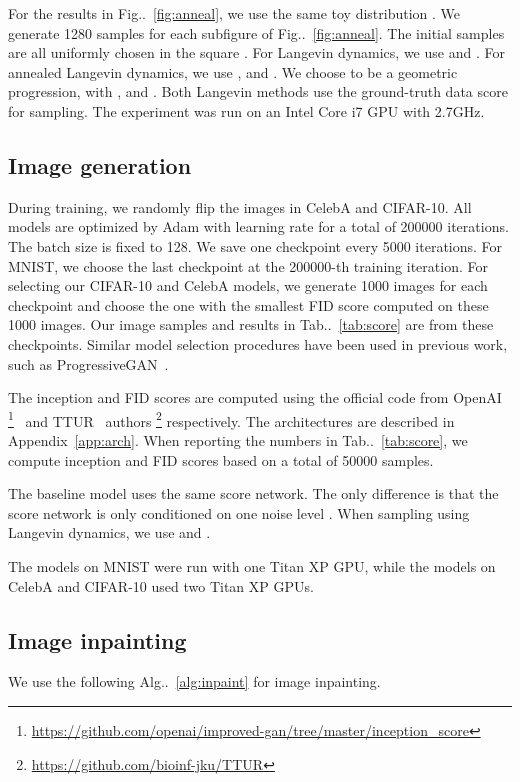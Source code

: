 \documentclass{article}
\makeatletter
\def\@onedot{\ifx\@let@token.\else.\null\fi\xspace}
\DeclareRobustCommand\onedot{\futurelet\@let@token\@onedot}
\newcommand{\figref}[1]{Fig\onedot~\ref{#1}}
\newcommand{\algoref}[1]{Alg\onedot~\ref{#1}}
\newcommand{\tabref}[1]{Tab\onedot~\ref{#1}}
\makeatother
\begin{document}
For the results in \figref{fig:anneal}, we use the same toy distribution . We generate 1280 samples for each subfigure of \figref{fig:anneal}. The initial samples are all uniformly chosen in the square . For Langevin dynamics, we use  and . For annealed Langevin dynamics, we use ,  and . We choose  to be a geometric progression, with ,  and . Both Langevin methods use the ground-truth data score for sampling. The experiment was run on an Intel Core i7 GPU with 2.7GHz.

\subsection{Image generation}
During training, we randomly flip the images in CelebA and CIFAR-10. All models are optimized by Adam with learning rate  for a total of 200000 iterations. The batch size is fixed to 128. We save one checkpoint every 5000 iterations. For MNIST, we choose the last checkpoint at the 200000-th training iteration. For selecting our CIFAR-10 and CelebA models, we generate 1000 images for each checkpoint and choose the one with the smallest FID score computed on these 1000 images. Our image samples and results in \tabref{tab:score} are from these checkpoints. Similar model selection procedures have been used in previous work, such as ProgressiveGAN~\cite{karras2018progressive}.

The inception and FID scores are computed using the official code from OpenAI \footnote{\href{https://github.com/openai/improved-gan/tree/master/inception_score}{\color{cyan}https://github.com/openai/improved-gan/tree/master/inception\_score}}~\cite{salimans2016improved} and TTUR~\cite{heusel2017gans} authors \footnote{\href{https://github.com/bioinf-jku/TTUR}{\color{cyan}https://github.com/bioinf-jku/TTUR}} respectively. The architectures are described in Appendix~\ref{app:arch}. When reporting the numbers in \tabref{tab:score}, we compute inception and FID scores based on a total of 50000 samples.

The baseline model uses the same score network. The only difference is that the score network is only conditioned on one noise level . When sampling using Langevin dynamics, we use  and .

The models on MNIST were run with one Titan XP GPU, while the models on CelebA and CIFAR-10 used two Titan XP GPUs.
\subsection{Image inpainting}\label{app:inpainting_algo}
We use the following \algoref{alg:inpaint} for image inpainting.
\end{document}

